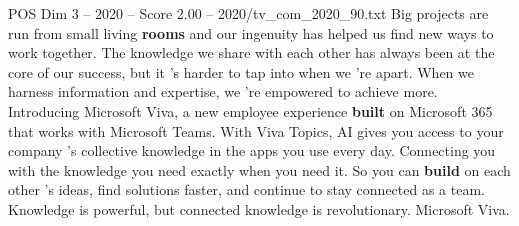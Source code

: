 \begin{textsample}{POS Dim 3 – 2020 – Score 2.00 – 2020/tv\_com\_2020\_90.txt}  \label{ex:f3_pos_065}
Big projects are run from small living \textbf{rooms} and our ingenuity has helped us find new ways to work together.
The knowledge we share with each other has always been at the core of our success, but it 's harder to tap into when we 're apart.
When we harness information and expertise, we 're empowered to achieve more.
Introducing Microsoft Viva, a new employee experience \textbf{built} on Microsoft 365 that works with Microsoft Teams.
With Viva Topics, AI gives you access to your company 's collective knowledge in the apps you use every day.
Connecting you with the knowledge you need exactly when you need it.
So you can \textbf{build} on each other 's ideas, find solutions faster, and continue to stay connected as a team.
Knowledge is powerful, but connected knowledge is revolutionary.
Microsoft Viva.

\end{textsample}
